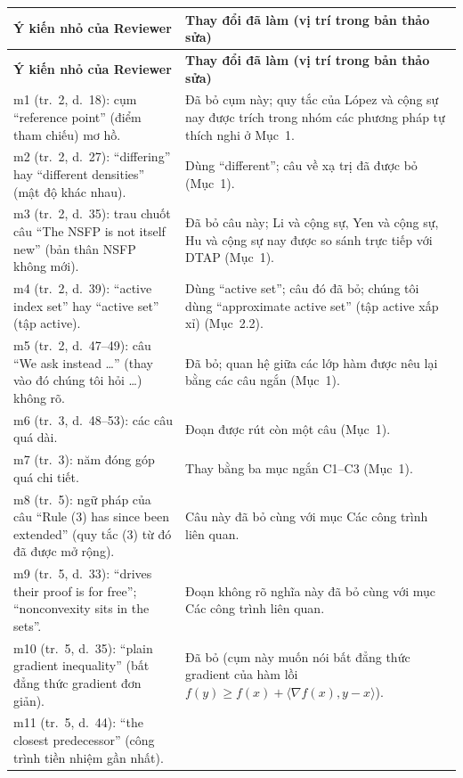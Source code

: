 \documentclass[11pt]{article}
\begin{document}
\medskip
{\footnotesize
\setlength{\tabcolsep}{5pt}
\renewcommand{\arraystretch}{1.25}
\begin{longtable}{@{}>{\raggedright\arraybackslash}p{}
                    >{\raggedright\arraybackslash}p{}@{}}
\toprule
\textbf{Ý kiến nhỏ của Reviewer} & \textbf{Thay đổi đã làm (vị trí trong bản thảo sửa)}\\
\midrule
\endfirsthead
\toprule
\textbf{Ý kiến nhỏ của Reviewer} & \textbf{Thay đổi đã làm (vị trí trong bản thảo sửa)}\\
\midrule
\endhead
\bottomrule
\endfoot
m1 (tr.~2, d.~18): cụm ``reference point'' (điểm tham chiếu) mơ hồ.
  & Đã bỏ cụm này; quy tắc của L\'opez và cộng sự nay được trích trong nhóm các phương pháp tự thích nghi ở Mục~1.\\
m2 (tr.~2, d.~27): ``differing'' hay ``different densities'' (mật độ khác nhau).
  & Dùng ``different''; câu về xạ trị đã được bỏ (Mục~1).\\
m3 (tr.~2, d.~35): trau chuốt câu ``The NSFP is not itself new'' (bản thân NSFP không mới).
  & Đã bỏ câu này; Li và cộng sự, Yen và cộng sự, Hu và cộng sự nay được so sánh trực tiếp với DTAP (Mục~1).\\
m4 (tr.~2, d.~39): ``active index set'' hay ``active set'' (tập active).
  & Dùng ``active set''; câu đó đã bỏ; chúng tôi dùng ``approximate active set'' (tập active xấp xỉ) (Mục~2.2).\\
m5 (tr.~2, d.~47--49): câu ``We ask instead \dots'' (thay vào đó chúng tôi hỏi \dots) không rõ.
  & Đã bỏ; quan hệ giữa các lớp hàm được nêu lại bằng các câu ngắn (Mục~1).\\
m6 (tr.~3, d.~48--53): các câu quá dài.
  & Đoạn được rút còn một câu (Mục~1).\\
m7 (tr.~3): năm đóng góp quá chi tiết.
  & Thay bằng ba mục ngắn C1--C3 (Mục~1).\\
m8 (tr.~5): ngữ pháp của câu ``Rule (3) has since been extended'' (quy tắc (3) từ đó đã được mở rộng).
  & Câu này đã bỏ cùng với mục Các công trình liên quan.\\
m9 (tr.~5, d.~33): ``drives their proof is for free''; ``nonconvexity sits in the sets''.
  & Đoạn không rõ nghĩa này đã bỏ cùng với mục Các công trình liên quan.\\
m10 (tr.~5, d.~35): ``plain gradient inequality'' (bất đẳng thức gradient đơn giản).
  & Đã bỏ (cụm này muốn nói bất đẳng thức gradient của hàm lồi $f(y)\ge f(x)+\langle\nabla f(x),y-x\rangle$).\\
m11 (tr.~5, d.~44): ``the closest predecessor'' (công trình tiền nhiệm gần nhất).

\end{longtable}}
\end{document}
